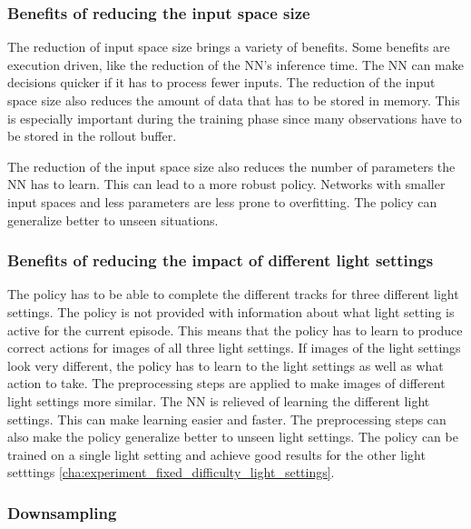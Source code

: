 \subsubsection*{Benefits of reducing the input space size}

The reduction of input space size brings a variety of benefits. Some benefits are execution driven, like the reduction of the \ac{NN}'s inference time. The \ac{NN} can make decisions quicker if it has to process fewer inputs. The reduction of the input space size also reduces the amount of data that has to be stored in memory. This is especially important during the training phase since many observations have to be stored in the rollout buffer.

The reduction of the input space size also reduces the number of parameters the \ac{NN} has to learn. This can lead to a more robust policy. Networks with smaller input spaces and less parameters are less prone to overfitting. The policy can generalize better to unseen situations.


\subsubsection*{Benefits of reducing the impact of different light settings}

The policy has to be able to complete the different tracks for three different light settings. The policy is not provided with information about what light setting is active for the current episode. This means that the policy has to learn to produce correct actions for images of all three light settings. If images of the light settings look very different, the policy has to learn to the light settings as well as what action to take.
The preprocessing steps are applied to make images of different light settings more similar. The \ac{NN} is relieved of learning the different light settings. This can make learning easier and faster.
The preprocessing steps can also make the policy generalize better to unseen light settings. The policy can be trained on a single light setting and achieve good results for the other light setttings \ref{cha:experiment_fixed_difficulty_light_settings}.



\subsubsection{Downsampling}

